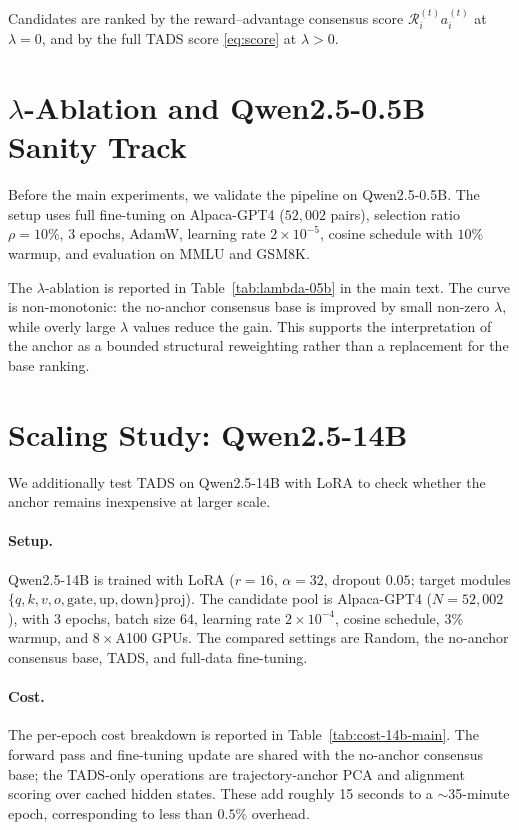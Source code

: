 \noindent Candidates are ranked by the reward--advantage consensus
score $\mathcal{R}_i^{(t)} a_i^{(t)}$ at $\lambda=0$, and by the
full \textsc{TADS} score \eqref{eq:score} at $\lambda>0$.

\section{$\lambda$-Ablation and Qwen2.5-0.5B Sanity Track}
\label{app:setup-validation}

Before the main experiments, we validate the pipeline on
Qwen2.5-0.5B. The setup uses full fine-tuning on Alpaca-GPT4
($52{,}002$ pairs), selection ratio $\rho=10\%$, 3 epochs, AdamW,
learning rate $2\times10^{-5}$, cosine schedule with $10\%$ warmup,
and evaluation on MMLU and GSM8K.

The $\lambda$-ablation is reported in Table~\ref{tab:lambda-05b} in
the main text. The curve is non-monotonic: the no-anchor consensus
base is improved by small non-zero $\lambda$, while overly large
$\lambda$ values reduce the gain. This supports the interpretation
of the anchor as a bounded structural reweighting rather than a
replacement for the base ranking.

\section{Scaling Study: Qwen2.5-14B}
\label{app:scaling}

We additionally test \textsc{TADS} on Qwen2.5-14B with LoRA to check
whether the anchor remains inexpensive at larger scale.

\paragraph{Setup.}
Qwen2.5-14B is trained with LoRA ($r=16$, $\alpha=32$, dropout
$0.05$; target modules
$\{q,k,v,o,\mathrm{gate},\mathrm{up},\mathrm{down}\}$proj). The
candidate pool is Alpaca-GPT4 ($N=52{,}002$), with 3 epochs, batch
size 64, learning rate $2\times10^{-4}$, cosine schedule, 3\%
warmup, and $8\times$A100 GPUs. The compared settings are Random,
the no-anchor consensus base, \textsc{TADS}, and full-data
fine-tuning.

\paragraph{Cost.}
The per-epoch cost breakdown is reported in
Table~\ref{tab:cost-14b-main}. The forward pass and fine-tuning
update are shared with the no-anchor consensus base; the
\textsc{TADS}-only operations are trajectory-anchor PCA and
alignment scoring over cached hidden states. These add roughly
15 seconds to a $\sim$35-minute epoch, corresponding to less than
$0.5\%$ overhead.

